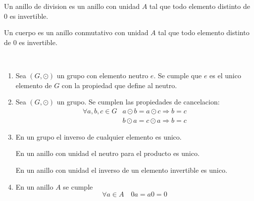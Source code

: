 \begin{definition}
	Un anillo de division es un anillo con unidad \(A \) tal que todo elemento distinto de \(0 \) es invertible.
\end{definition}

\begin{definition}[Cuerpo]
	Un cuerpo es un anillo conmutativo con unidad \(A \) tal que todo elemento distinto de 0 es invertible.
\end{definition}

\begin{proposition}
	~\begin{enumerate}
		\item Sea \((G, \odot )\) un grupo con elemento neutro \(e \). Se cumple que \(e \) es el unico elemento de \(G \) con la propiedad que define al neutro.
		\item Sea \((G, \odot )\) un grupo. Se cumplen las propiedades de cancelacion:
		      \[
			      \begin{array}{cc}
				      \forall a,b,c \in G & a \odot b = a \odot c \Rightarrow b = c  \\
				                          & b \odot a = c \odot a \Rightarrow b = c
			      \end{array}
		      \]
		\item En un grupo el inverso de cualquier elemento es unico.
		      
		      En un anillo con unidad el neutro para el producto es unico.
		      
		      En un anillo con unidad el inverso de un elemento invertible es unico.
		      
		\item En un anillo \(A \) se cumple
		      \[
			      \forall a \in A \quad 0a = a0 = 0
		      \]
	\end{enumerate}
\end{proposition}
